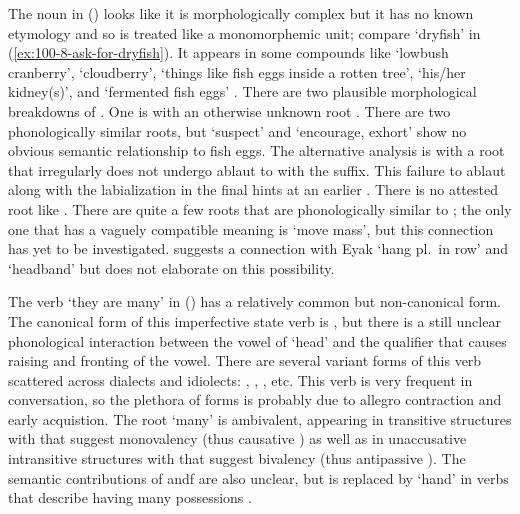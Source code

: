 The noun  in (\lastx) looks like it is morphologically complex but it has no known etymology and so is treated like a monomorphemic unit; compare  ‘dryfish’ in (\ref{ex:100-8-ask-for-dryfish}).
It appears in some compounds like  ‘lowbush cranberry’,  ‘cloudberry’,  ‘things like fish eggs inside a rotten tree’,  ‘his/her kidney(s)’, and  ‘fermented fish eggs’ \parencite[01/105]{leer:1973}.
There are two plausible morphological breakdowns of .
One is  with an otherwise unknown root .
There are two phonologically similar roots, but  ‘suspect’ \parencite[01/100]{leer:1973} and  ‘encourage, exhort’ \parencite[01/101–103]{leer:1973} show no obvious semantic relationship to fish eggs.
The alternative analysis is  with a root  that irregularly does not undergo ablaut to  with the  suffix.
This failure to ablaut along with the labialization in the final  hints at an earlier .
There is no attested root like .
There are quite a few roots that are phonologically similar to ; the only one that has a vaguely compatible meaning is  ‘move mass’, but this connection has yet to be investigated.
\textcite[2]{leer:1978b} suggests a connection with Eyak  ‘hang pl.\ in row’ \parencite[2012]{krauss:1970} and  ‘headband’ \parencite[2013]{krauss:1970} but does not elaborate on this possibility.

The verb  ‘they are many’ in (\lastx) has a relatively common but non-canonical form.
The canonical form of this imperfective state verb is , but there is a still unclear phonological interaction between the  vowel of  ‘head’ and the  qualifier that causes raising and fronting of the vowel.
There are several variant forms of this verb scattered across dialects and idiolects: , , , etc.
This verb is very frequent in conversation, so the plethora of forms is probably due to allegro contraction and early acquistion.
The root  ‘many’ is ambivalent, appearing in transitive structures with  that suggest monovalency (thus causative ) as well as in unaccusative intransitive structures with  that suggest bivalency (thus antipassive ).
The semantic contributions of  andf  are also unclear, but  is replaced by  ‘hand’ in verbs that describe having many possessions \parencite[01/3]{leer:1973}.

